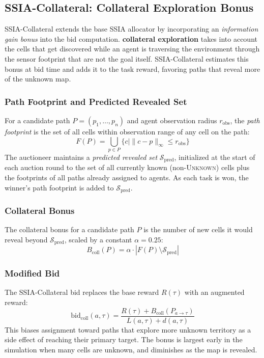 \documentclass[conference]{IEEEtran}
\begin{document}
\subsection{SSIA-Collateral: Collateral Exploration Bonus}

SSIA-Collateral extends the base SSIA allocator by incorporating an \emph{information gain bonus} into the bid computation. \textbf{collateral exploration} takes into account the cells that get discovered while an agent is traversing the environment through the sensor footprint that are not the goal itself. SSIA-Collateral estimates this bonus at bid time and adds it to the task reward, favoring paths that reveal more of the unknown map.

\subsubsection{Path Footprint and Predicted Revealed Set}
For a candidate path $P = (p_1, \ldots, p_n)$ and agent observation radius $r_{\text{obs}}$, the \emph{path footprint} is the set of all cells within observation range of any cell on the path:
\begin{equation}
    F(P) = \bigcup_{p \in P} \{c \mid \|c - p\|_\infty \leq r_{\text{obs}}\}
\end{equation}
The auctioneer maintains a \emph{predicted revealed set} $\mathcal{S}_{\text{pred}}$, initialized at the start of each auction round to the set of all currently known (non-\textsc{Unknown}) cells plus the footprints of all paths already assigned to agents. As each task is won, the winner's path footprint is added to $\mathcal{S}_{\text{pred}}$.

\subsubsection{Collateral Bonus}
The collateral bonus for a candidate path $P$ is the number of new cells it would reveal beyond $\mathcal{S}_{\text{pred}}$, scaled by a constant $\alpha = 0.25$:
\begin{equation}
    B_{\text{coll}}(P) = \alpha \cdot |F(P) \setminus \mathcal{S}_{\text{pred}}|
\end{equation}

\subsubsection{Modified Bid}
The SSIA-Collateral bid replaces the base reward $R(\tau)$ with an augmented reward:
\begin{equation}
    \text{bid}_{\text{coll}}(a, \tau) = \frac{R(\tau) + B_{\text{coll}}(P_{a \to \tau})}{L(a, \tau) + d(a, \tau)}
    \label{eq:bid_coll}
\end{equation}
This biases assignment toward paths that explore more unknown territory as a side effect of reaching their primary target. The bonus is largest early in the simulation when many cells are unknown, and diminishes as the map is revealed.
\end{document}
